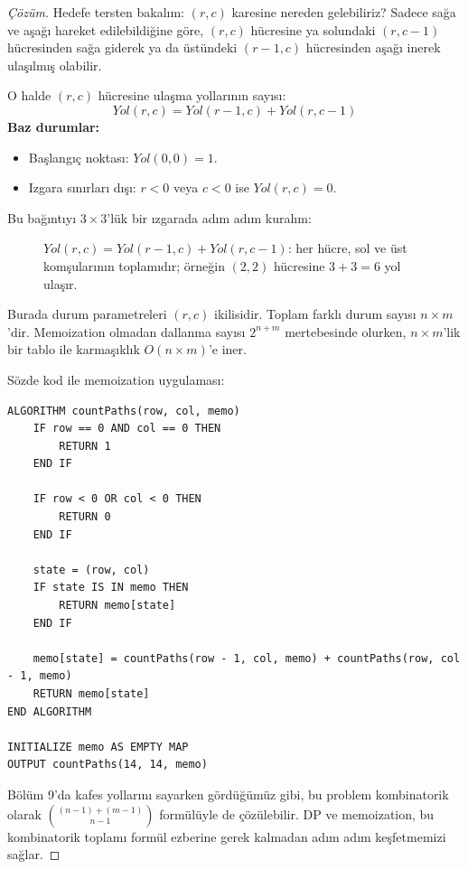 \begin{proof}[Çözüm]
Hedefe tersten bakalım: $(r, c)$ karesine nereden gelebiliriz?
Sadece sağa ve aşağı hareket edilebildiğine göre, $(r, c)$ hücresine ya solundaki $(r, c-1)$ hücresinden sağa giderek ya da üstündeki $(r-1, c)$ hücresinden aşağı inerek ulaşılmış olabilir.

O halde $(r, c)$ hücresine ulaşma yollarının sayısı:
\[
Yol(r, c) = Yol(r-1, c) + Yol(r, c-1)
\]
\textbf{Baz durumlar:}
\begin{itemize}
    \item Başlangıç noktası: $Yol(0, 0) = 1$.
    \item Izgara sınırları dışı: $r < 0$ veya $c < 0$ ise $Yol(r, c) = 0$.
\end{itemize}

Bu bağıntıyı $3 \times 3$'lük bir ızgarada adım adım kuralım:

\begin{figure}[ht]
\centering
{}
\caption{$Yol(r, c) = Yol(r-1, c) + Yol(r, c-1)$: her hücre, sol ve üst
komşularının toplamıdır; örneğin $(2,2)$ hücresine $3+3=6$ yol ulaşır.}
\end{figure}

Burada durum parametreleri $(r, c)$ ikilisidir. Toplam farklı durum sayısı $n \times m$'dir. Memoization olmadan dallanma sayısı $2^{n+m}$ mertebesinde olurken, $n \times m$'lik bir tablo ile karmaşıklık $O(n \times m)$'e iner.

Sözde kod ile memoization uygulaması:
\begin{lstlisting}
ALGORITHM countPaths(row, col, memo)
    IF row == 0 AND col == 0 THEN
        RETURN 1
    END IF

    IF row < 0 OR col < 0 THEN
        RETURN 0
    END IF

    state = (row, col)
    IF state IS IN memo THEN
        RETURN memo[state]
    END IF

    memo[state] = countPaths(row - 1, col, memo) + countPaths(row, col - 1, memo)
    RETURN memo[state]
END ALGORITHM

INITIALIZE memo AS EMPTY MAP
OUTPUT countPaths(14, 14, memo)\end{lstlisting}
Bölüm 9'da kafes yollarını sayarken gördüğümüz gibi, bu problem kombinatorik olarak $\binom{(n-1)+(m-1)}{n-1}$ formülüyle de çözülebilir. DP ve memoization, bu kombinatorik toplamı formül ezberine gerek kalmadan adım adım keşfetmemizi sağlar.
\end{proof}

